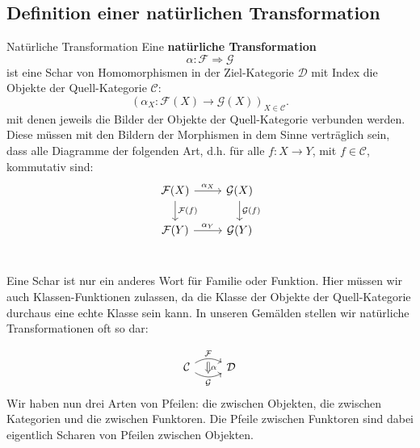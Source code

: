 \documentclass[a4paper]{amsart}
\theoremstyle{definition}
\begin{document}
\subsection{Definition einer natürlichen Transformation}
\begin{Definition}{Natürliche Transformation}
   Eine \textbf{natürliche Transformation} 
   \begin{equation}
      \alpha \colon \mathcal F \Rightarrow \mathcal G
   \end{equation}
   ist eine Schar von Homomorphismen in der Ziel-Kategorie $\mathcal{D}$ mit Index die Objekte der Quell-Kategorie $\mathcal C$:
   \begin{equation}
      \left (\alpha_X \colon \mathcal F(X) \to \mathcal G(X) \right )_{X \in \mathcal C}.
   \end{equation}
   mit denen jeweils die Bilder der Objekte der Quell-Kategorie verbunden werden. Diese müssen mit den Bildern der Morphismen in dem Sinne verträglich sein, dass alle Diagramme der folgenden Art, d.h. für alle $f \colon X \to Y$, mit $f \in \mathcal C$, kommutativ sind:
   \begin{equation}\label{kommutativ}
      \begin{tikzcd}
         \mathcal F(X) \arrow[r, "\alpha_X"] \arrow[d, "\mathcal F(f)"]
            & \mathcal  G(X) \arrow[d, "\mathcal G(f)"]\\
         \mathcal F(Y) \arrow[r, "\alpha_Y"]  
            & \mathcal  G(Y)\\
      \end{tikzcd}
   \end{equation}
\end{Definition}

Eine Schar ist nur ein anderes Wort für Familie oder Funktion. Hier müssen wir auch Klassen-Funktionen zulassen, da die Klasse der Objekte der Quell-Kategorie durchaus eine echte Klasse sein kann. In unseren Gemälden stellen wir natürliche Transformationen oft so dar:

\begin{equation}
   \begin{tikzcd}
      \mathcal C 
         \arrow[r, bend left, "\mathcal F"{name=0}] 
         \arrow[r, bend right, swap, "\mathcal G"{name=1}] 
         \arrow[Rightarrow, from=0, to=1,shorten >= 6pt, yshift = -3pt, "\alpha"{yshift=3pt}]
      & \mathcal D
   \end{tikzcd}
\end{equation}
Wir haben nun drei Arten von Pfeilen: die zwischen Objekten, die zwischen Kategorien und die zwischen Funktoren. Die Pfeile zwischen Funktoren sind dabei eigentlich Scharen von Pfeilen zwischen Objekten.
\end{document}
